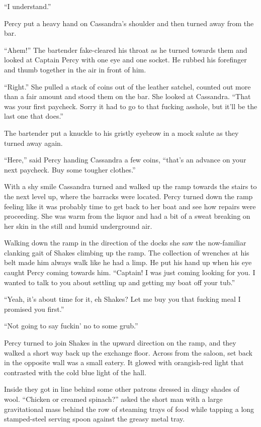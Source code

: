 \documentclass[
]{scrbook}
\begin{document}
``I understand.''

Percy put a heavy hand on Cassandra's shoulder and then turned away from
the bar.

``Ahem!'' The bartender fake-cleared his throat as he turned towards
them and looked at Captain Percy with one eye and one socket. He rubbed
his forefinger and thumb together in the air in front of him.

``Right.'' She pulled a stack of coins out of the leather satchel,
counted out more than a fair amount and stood them on the bar. She
looked at Cassandra. ``That was your first paycheck. Sorry it had to go
to that fucking asshole, but it'll be the last one that does.''

The bartender put a knuckle to his gristly eyebrow in a mock salute as
they turned away again.

``Here,'' said Percy handing Cassandra a few coins, ``that's an advance
on your next paycheck. Buy some tougher clothes.''

With a shy smile Cassandra turned and walked up the ramp towards the
stairs to the next level up, where the barracks were located. Percy
turned down the ramp feeling like it was probably time to get back to
her boat and see how repairs were proceeding. She was warm from the
liquor and had a bit of a sweat breaking on her skin in the still and
humid underground air.

Walking down the ramp in the direction of the docks she saw the
now-familiar clanking gait of Shakes climbing up the ramp. The
collection of wrenches at his belt made him always walk like he had a
limp. He put his hand up when his eye caught Percy coming towards him.
``Captain! I was just coming looking for you. I wanted to talk to you
about settling up and getting my boat off your tub.''

``Yeah, it's about time for it, eh Shakes? Let me buy you that fucking
meal I promised you first.''

``Not going to say fuckin' no to some grub.''

Percy turned to join Shakes in the upward direction on the ramp, and
they walked a short way back up the exchange floor. Across from the
saloon, set back in the opposite wall was a small eatery. It glowed with
orangish-red light that contrasted with the cold blue light of the hall.

Inside they got in line behind some other patrons dressed in dingy
shades of wool. ``Chicken or creamed spinach?'' asked the short man with
a large gravitational mass behind the row of steaming trays of food
while tapping a long stamped-steel serving spoon against the greasy
metal tray.
\end{document}
